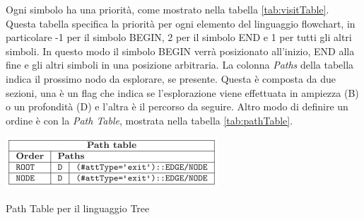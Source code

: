                 Ogni simbolo ha una priorità, come mostrato nella tabella \ref{tab:visitTable}. Questa tabella specifica la priorità per ogni elemento del linguaggio flowchart, in particolare -1 per il simbolo BEGIN, 2 per il simbolo END e 1 per tutti gli altri simboli. In questo modo il simbolo BEGIN verrà posizionato all'inizio, END alla fine e gli altri simboli in una posizione arbitraria. 
                \newline
                La colonna \textit{Paths} della tabella indica il prossimo nodo da esplorare, se presente. Questa è composta da due sezioni, una è un flag che indica se l'esplorazione viene effettuata in ampiezza (B) o un profondità (D) e l'altra è il percorso da seguire.
                \newline
                Altro modo di definire un ordine è con la \textit{Path Table}, mostrata nella tabella \ref{tab:pathTable}. 

                \begin{table}[htbp]
                    \centering
                    \includegraphics[scale=0.85]{Figure/pathTable.PNG}
                    \caption{Path Table per il linguaggio Tree}
                    \label{tab:pathTable}
                \end{table}

